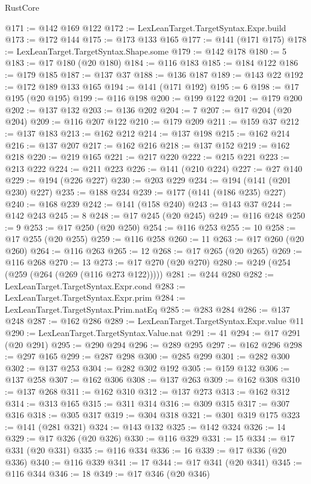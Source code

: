 \begin{lexlean}{RustCore}
\begin{coremodule}
@171 := @142 @169 @122
@172 := LexLeanTarget.TargetSyntax.Expr.build
@173 := @172 @144
@175 := @173 @133 @165
@177 := @141 (@171 @175)
@178 := LexLeanTarget.TargetSyntax.Shape.some
@179 := @142 @178
@180 := 5
@183 := @17 @180 (@20 @180)
@184 := @116 @183
@185 := @184 @122
@186 := @179 @185
@187 := @137 @37
@188 := @136 @187
@189 := @143 @22
@192 := @172 @189 @133 @165
@194 := @141 (@171 @192)
@195 := 6
@198 := @17 @195 (@20 @195)
@199 := @116 @198
@200 := @199 @122
@201 := @179 @200
@202 := @137 @132
@203 := @136 @202
@204 := 7
@207 := @17 @204 (@20 @204)
@209 := @116 @207 @122
@210 := @179 @209
@211 := @159 @37
@212 := @137 @183
@213 := @162 @212
@214 := @137 @198
@215 := @162 @214
@216 := @137 @207
@217 := @162 @216
@218 := @137 @152
@219 := @162 @218
@220 := @219 @165
@221 := @217 @220
@222 := @215 @221
@223 := @213 @222
@224 := @211 @223
@226 := @141 (@210 @224)
@227 := @27 @140
@229 := @194 (@226 @227)
@230 := @203 @229
@234 := @194 (@141 (@201 @230) @227)
@235 := @188 @234
@239 := @177 (@141 (@186 @235) @227)
@240 := @168 @239
@242 := @141 (@158 @240)
@243 := @143 @37
@244 := @142 @243
@245 := 8
@248 := @17 @245 (@20 @245)
@249 := @116 @248
@250 := 9
@253 := @17 @250 (@20 @250)
@254 := @116 @253
@255 := 10
@258 := @17 @255 (@20 @255)
@259 := @116 @258
@260 := 11
@263 := @17 @260 (@20 @260)
@264 := @116 @263
@265 := 12
@268 := @17 @265 (@20 @265)
@269 := @116 @268
@270 := 13
@273 := @17 @270 (@20 @270)
@280 := @249 (@254 (@259 (@264 (@269 (@116 @273 @122)))))
@281 := @244 @280
@282 := LexLeanTarget.TargetSyntax.Expr.cond
@283 := LexLeanTarget.TargetSyntax.Expr.prim
@284 := LexLeanTarget.TargetSyntax.Prim.natEq
@285 := @283 @284
@286 := @137 @248
@287 := @162 @286
@289 := LexLeanTarget.TargetSyntax.Expr.value @11
@290 := LexLeanTarget.TargetSyntax.Value.nat
@291 := 41
@294 := @17 @291 (@20 @291)
@295 := @290 @294
@296 := @289 @295
@297 := @162 @296
@298 := @297 @165
@299 := @287 @298
@300 := @285 @299
@301 := @282 @300
@302 := @137 @253
@304 := @282 @302 @192
@305 := @159 @132
@306 := @137 @258
@307 := @162 @306
@308 := @137 @263
@309 := @162 @308
@310 := @137 @268
@311 := @162 @310
@312 := @137 @273
@313 := @162 @312
@314 := @313 @165
@315 := @311 @314
@316 := @309 @315
@317 := @307 @316
@318 := @305 @317
@319 := @304 @318
@321 := @301 @319 @175
@323 := @141 (@281 @321)
@324 := @143 @132
@325 := @142 @324
@326 := 14
@329 := @17 @326 (@20 @326)
@330 := @116 @329
@331 := 15
@334 := @17 @331 (@20 @331)
@335 := @116 @334
@336 := 16
@339 := @17 @336 (@20 @336)
@340 := @116 @339
@341 := 17
@344 := @17 @341 (@20 @341)
@345 := @116 @344
@346 := 18
@349 := @17 @346 (@20 @346)

\end{coremodule}
\end{lexlean}
